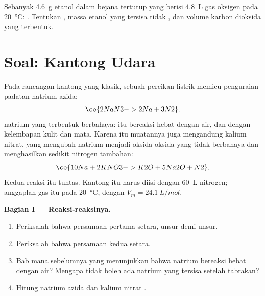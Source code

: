 \begin{exercise}[$\star\star\star$]\label{exo:g10:reaction-progress-table:15}
Sebanyak \qty{4.6}{g} etanol   dalam bejana tertutup
yang berisi \qty{4.8}{L} gas oksigen pada \qty{20}{\celsius}:
. Tentukan , massa etanol
yang tersisa tidak , dan volume karbon dioksida yang terbentuk.
\end{exercise}

\section{Soal: Kantong Udara}

\begin{problem}
\label{pb:g10:reaction-progress-table:1}
Pada rancangan kantong  yang klasik, sebuah percikan listrik memicu
penguraian padatan natrium azida:
\[
  \ce{2NaN3 -> 2Na + 3N2} .
\]
 natrium yang terbentuk berbahaya:  itu bereaksi hebat dengan
air, dan dengan kelembapan kulit dan mata. Karena itu muatannya juga
mengandung kalium nitrat, yang mengubah natrium menjadi oksida-oksida
yang tidak berbahaya dan menghasilkan sedikit nitrogen tambahan:
\[
  \ce{10Na + 2KNO3 -> K2O + 5Na2O + N2} .
\]
Kedua reaksi itu tuntas. Kantong  itu harus diisi dengan
\qty{60}{L} nitrogen; anggaplah gas itu pada \qty{20}{\celsius}, dengan
$V_m = \qty{24.1}{L/mol}$.

\medskip
\noindent\textbf{Bagian I --- Reaksi-reaksinya.}
\begin{enumerate}
  \item Periksalah bahwa persamaan pertama setara, unsur demi unsur.
  \item Periksalah bahwa persamaan kedua setara.
  \item Bab mana sebelumnya yang menunjukkan bahwa natrium bereaksi hebat
        dengan air? Mengapa tidak boleh ada natrium yang tersisa setelah
        tabrakan?
  \item Hitung  natrium azida  dan kalium nitrat
        .
\end{enumerate}


\end{problem}
